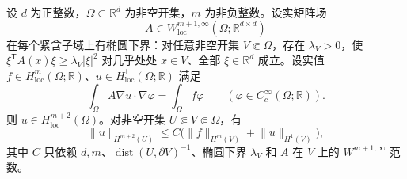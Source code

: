 \begin{theorem}[内部高阶正则性]
\label{b2:thm:16-higher-regularity}
设 \(d\) 为正整数，\(\Omega\subset\mathbb R^d\) 为非空开集，\(m\) 为非负整数。设实矩阵场
\[
 A\in W_{\mathrm{loc}}^{m+1,\infty}(\Omega;\mathbb R^{d\times d})
\]
在每个紧含子域上有椭圆下界：对任意非空开集 \(V\Subset\Omega\)，存在 \(\lambda_V>0\)，使 \(\xi^{\mathsf T}A(x)\xi\geq\lambda_V|\xi|^2\) 对几乎处处 \(x\in V\)、全部 \(\xi\in\mathbb R^d\) 成立。设实值 \(f\in H_{\mathrm{loc}}^m(\Omega;\mathbb R)\)、\(u\in H_{\mathrm{loc}}^1(\Omega;\mathbb R)\) 满足
\[
 \int_\Omega A\nabla u\cdot\nabla\varphi=\int_\Omega f\varphi
 \qquad(\varphi\in C_c^\infty(\Omega;\mathbb R)).
\]
则 \(u\in H_{\mathrm{loc}}^{m+2}(\Omega)\)。对非空开集 \(U\Subset V\Subset\Omega\)，有
\[\lVert u\rVert_{H^{m+2}(U)}
 \le C\bigl(\lVert f\rVert_{H^m(V)}+\lVert u\rVert_{H^1(V)}\bigr),\]
其中 \(C\) 只依赖 \(d,m\)、\(\operatorname{dist}(U,\partial V)^{-1}\)、椭圆下界 \(\lambda_V\) 和 \(A\) 在 \(V\) 上的 \(W^{m+1,\infty}\) 范数。
\end{theorem}
